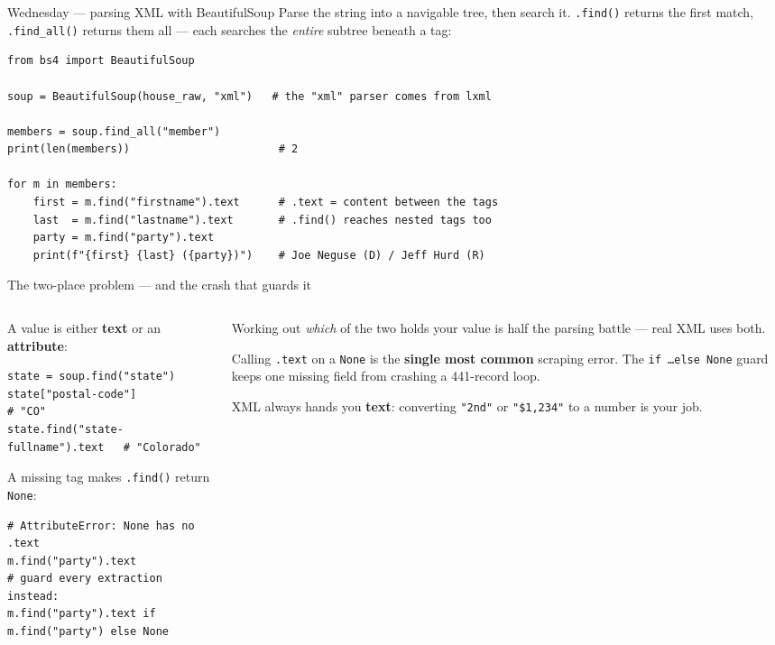 \documentclass[9pt,aspectratio=169]{beamer}
\begin{document}
\begin{frame}[fragile]{Wednesday --- parsing XML with BeautifulSoup}
    Parse the string into a navigable tree, then search it. \texttt{.find()} returns the first match, \texttt{.find\_all()} returns them all --- each searches the \textit{entire} subtree beneath a tag:
\begin{lstlisting}
from bs4 import BeautifulSoup

soup = BeautifulSoup(house_raw, "xml")   # the "xml" parser comes from lxml

members = soup.find_all("member")
print(len(members))                       # 2

for m in members:
    first = m.find("firstname").text      # .text = content between the tags
    last  = m.find("lastname").text       # .find() reaches nested tags too
    party = m.find("party").text
    print(f"{first} {last} ({party})")    # Joe Neguse (D) / Jeff Hurd (R)
\end{lstlisting}
\end{frame}

\begin{frame}[fragile]{The two-place problem --- and the crash that guards it}
    \begin{columns}[T]
        \begin{column}{0.54\textwidth}
            A value is either \textbf{text} or an \textbf{attribute}:
\begin{lstlisting}
state = soup.find("state")
state["postal-code"]                # "CO"
state.find("state-fullname").text   # "Colorado"
\end{lstlisting}
            A missing tag makes \texttt{.find()} return \texttt{None}:
\begin{lstlisting}
# AttributeError: None has no .text
m.find("party").text
# guard every extraction instead:
m.find("party").text if m.find("party") else None
\end{lstlisting}
        \end{column}
        \begin{column}{0.44\textwidth}
            Working out \textit{which} of the two holds your value is half the parsing battle --- real XML uses both.

            \vspace{0.75em}

            Calling \texttt{.text} on a \texttt{None} is the \textbf{single most common} scraping error. The \texttt{if \dots else None} guard keeps one missing field from crashing a 441-record loop.

            \vspace{0.75em}

            XML always hands you \textbf{text}: converting \texttt{"2nd"} or \texttt{"\$1,234"} to a number is your job.
        \end{column}
    \end{columns}
\end{frame}
\end{document}

